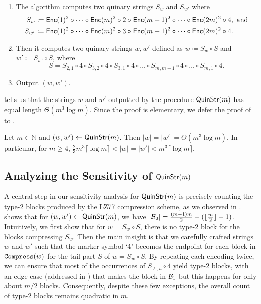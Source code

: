 \begin{tcolorbox}[breakable,enhanced,title={The Construction of Two Quinary Strings $\QuinStr(m)$.}]
    \begin{enumerate}
        \item The algorithm computes two quinary strings $S_w$ and $S_{w'}$ where
        \begin{align*}
            S_w &\coloneqq\mathsf{Enc}(1)^2\circ\cdots\circ\mathsf{Enc}(m)^2\circ 2 \circ\mathsf{Enc}(m+1)^2\circ\cdots\circ\mathsf{Enc}(2m)^2\circ 4,\text{ and}\\
            S_{w'} &\coloneqq\mathsf{Enc}(1)^2\circ\cdots\circ\mathsf{Enc}(m)^2\circ 3 \circ\mathsf{Enc}(m+1)^2\circ\cdots\circ\mathsf{Enc}(2m)^2\circ 4.
        \end{align*}
        \item Then it computes two quinary strings $w,w'$ defined as $w\coloneqq S_w\circ S$ and $w'\coloneqq S_{w'}\circ S$, where
        \[S = S_{2,1} \circ 4 \circ S_{3,2} \circ 4 \circ S_{3,1} \circ 4 \circ \ldots \circ S_{m,m-1} \circ 4 \circ \ldots \circ S_{m,1}\circ 4.\]
        \item Output $(w,w')$.
    \end{enumerate}
\end{tcolorbox}

 tells us that the strings $w$ and $w'$ outputted by the procedure $\QuinStr(m)$ has equal length $\Theta(m^3\log m)$. Since the proof is elementary, we defer the proof of  to .

\newcommand{\claimlength}{
Let $m\in\mathbb{N}$ and $(w,w')\gets\QuinStr(m)$. Then $|w|=|w'|=\Theta(m^3\log m)$. In particular, for $m\geq 4$, $\frac{2}{3}m^3\lceil\log m\rceil< |w|=|w'|< m^3\lceil\log m\rceil$.
}
\begin{claim}
\claimlength
\end{claim}

\subsection{Analyzing the Sensitivity of $\QuinStr(m)$}

A central step in our sensitivity analysis for $\QuinStr(m)$ is precisely counting the type-2 blocks produced by the LZ77 compression scheme, as we observed in .  shows that for $(w,w')\gets\mathsf{QuinStr}(m)$, we have $|{\mathcal{B}}_2|=\frac{(m-1)m}{2}-(\lfloor\frac{m}{2}\rfloor-1)$. Intuitively, we first show that for $w=S_w\circ S$, there is no type-2 block for the blocks compressing $S_w$. Then the main insight is that we carefully crafted strings $w$ and $w'$ such that the marker symbol `4' becomes the endpoint for each block in $\mathtt{Compress}(w)$ for the tail part $S$ of $w=S_w\circ S$. By repeating each encoding twice, we can ensure that most of the occurrences of $S_{\ell,u}\circ 4$ yield type-2 blocks, with an edge case (addressed in ) that makes the block in ${\mathcal{B}}_1$ but this happens for only about $m/2$ blocks. Consequently, despite these few exceptions, the overall count of type-2 blocks remains quadratic in $m$.

